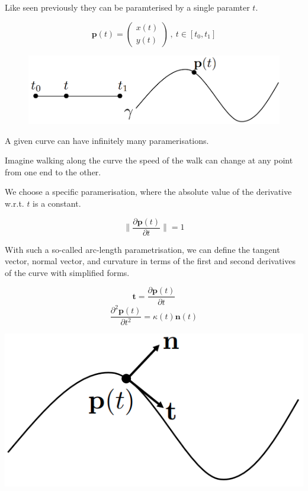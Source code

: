 \documentclass{article}
\begin{document}
\vspace{5px}

Like seen previously they can be paramterised by a single paramter \(t\).

\[
    \mathbf{p}(t) = \begin{pmatrix}
        x(t)\\
        y(t)
    \end{pmatrix}\, , \ t \in [t_{0}, t_{1}]
\]

\begin{figure}[!ht]
    \centering
    \includegraphics[width=0.5\linewidth]{images/planar_curvature.png}
\end{figure}

A given curve can have infinitely many paramerisations.

\vspace{5px}

Imagine walking along the curve the speed of the walk can change at any point from one end to the other.

\vspace{5px}

We choose a specific paramerisation, where the absolute value of the derivative w.r.t. \(t\) is a constant.

\[
    \lVert \frac{\partial \mathbf{p}(t)}{\partial t} \rVert = 1 
\]

With such a so-called arc-length parametrisation, we can define the tangent vector, 
normal vector, and curvature in terms of the first and second derivatives of the curve with simplified forms.

\begin{minipage}{0.435\textwidth}
    \[
        \mathbf{t} = \frac{\partial \mathbf{p}(t)}{\partial t}
    \]
    \[
        \frac{\partial^2 \mathbf{p}(t)}{\partial t^2} = \kappa(t) \mathbf{n}(t)
    \]
\end{minipage}
\begin{minipage}{0.435\textwidth}
    \includegraphics[width=0.7\linewidth]{images/planar_tang_norm.png}
\end{minipage}
\end{document}

